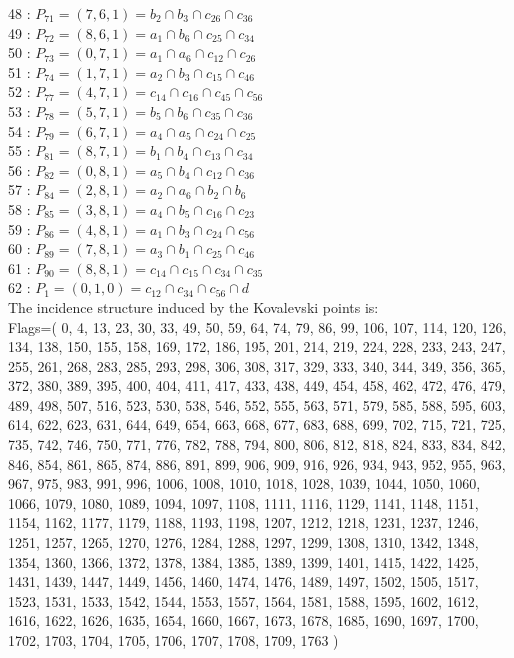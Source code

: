 \documentclass{article}
\begin{document}
{48 : $P_{71}=( 7, 6, 1 ) = b_{2} \cap b_{3} \cap c_{26} \cap c_{36}$\\
49 : $P_{72}=( 8, 6, 1 ) = a_{1} \cap b_{6} \cap c_{25} \cap c_{34}$\\
50 : $P_{73}=( 0, 7, 1 ) = a_{1} \cap a_{6} \cap c_{12} \cap c_{26}$\\
51 : $P_{74}=( 1, 7, 1 ) = a_{2} \cap b_{3} \cap c_{15} \cap c_{46}$\\
52 : $P_{77}=( 4, 7, 1 ) = c_{14} \cap c_{16} \cap c_{45} \cap c_{56}$\\
53 : $P_{78}=( 5, 7, 1 ) = b_{5} \cap b_{6} \cap c_{35} \cap c_{36}$\\
54 : $P_{79}=( 6, 7, 1 ) = a_{4} \cap a_{5} \cap c_{24} \cap c_{25}$\\
55 : $P_{81}=( 8, 7, 1 ) = b_{1} \cap b_{4} \cap c_{13} \cap c_{34}$\\
56 : $P_{82}=( 0, 8, 1 ) = a_{5} \cap b_{4} \cap c_{12} \cap c_{36}$\\
57 : $P_{84}=( 2, 8, 1 ) = a_{2} \cap a_{6} \cap b_{2} \cap b_{6}$\\
58 : $P_{85}=( 3, 8, 1 ) = a_{4} \cap b_{5} \cap c_{16} \cap c_{23}$\\
59 : $P_{86}=( 4, 8, 1 ) = a_{1} \cap b_{3} \cap c_{24} \cap c_{56}$\\
60 : $P_{89}=( 7, 8, 1 ) = a_{3} \cap b_{1} \cap c_{25} \cap c_{46}$\\
61 : $P_{90}=( 8, 8, 1 ) = c_{14} \cap c_{15} \cap c_{34} \cap c_{35}$\\
62 : $P_{1}=( 0, 1, 0 ) = c_{12} \cap c_{34} \cap c_{56} \cap d$\\
The incidence structure induced by the Kovalevski points is: 
\\
Flags=( 0, 4, 13, 23, 30, 33, 49, 50, 59, 64, 74, 79, 86, 99, 106, 107, 114, 120, 126, 134, 138, 150, 155, 158, 169, 172, 186, 195, 201, 214, 219, 224, 228, 233, 243, 247, 255, 261, 268, 283, 285, 293, 298, 306, 308, 317, 329, 333, 340, 344, 349, 356, 365, 372, 380, 389, 395, 400, 404, 411, 417, 433, 438, 449, 454, 458, 462, 472, 476, 479, 489, 498, 507, 516, 523, 530, 538, 546, 552, 555, 563, 571, 579, 585, 588, 595, 603, 614, 622, 623, 631, 644, 649, 654, 663, 668, 677, 683, 688, 699, 702, 715, 721, 725, 735, 742, 746, 750, 771, 776, 782, 788, 794, 800, 806, 812, 818, 824, 833, 834, 842, 846, 854, 861, 865, 874, 886, 891, 899, 906, 909, 916, 926, 934, 943, 952, 955, 963, 967, 975, 983, 991, 996, 1006, 1008, 1010, 1018, 1028, 1039, 1044, 1050, 1060, 1066, 1079, 1080, 1089, 1094, 1097, 1108, 1111, 1116, 1129, 1141, 1148, 1151, 1154, 1162, 1177, 1179, 1188, 1193, 1198, 1207, 1212, 1218, 1231, 1237, 1246, 1251, 1257, 1265, 1270, 1276, 1284, 1288, 1297, 1299, 1308, 1310, 1342, 1348, 1354, 1360, 1366, 1372, 1378, 1384, 1385, 1389, 1399, 1401, 1415, 1422, 1425, 1431, 1439, 1447, 1449, 1456, 1460, 1474, 1476, 1489, 1497, 1502, 1505, 1517, 1523, 1531, 1533, 1542, 1544, 1553, 1557, 1564, 1581, 1588, 1595, 1602, 1612, 1616, 1622, 1626, 1635, 1654, 1660, 1667, 1673, 1678, 1685, 1690, 1697, 1700, 1702, 1703, 1704, 1705, 1706, 1707, 1708, 1709, 1763 )\\
}
\end{document}
